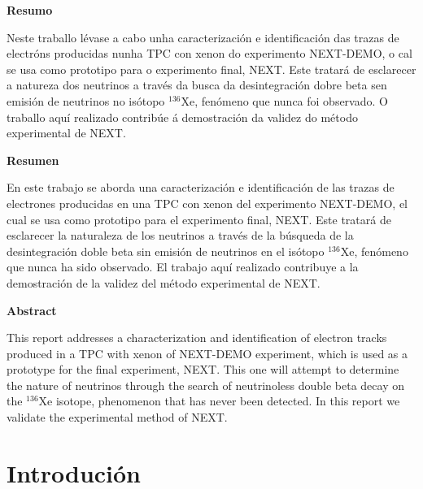 \documentclass[a4paper,12pt]{article}
\begin{document}
\thispagestyle{empty} 
\setcounter{page}{0}
\begin{center} \textbf{Resumo}\end{center}
\noindent
Neste traballo lévase a cabo unha caracterización e identificación das trazas de electróns producidas nunha TPC con xenon do experimento NEXT-DEMO, o cal se usa como prototipo para o experimento final, NEXT. Este tratará de esclarecer a natureza dos neutrinos a través da busca da desintegración dobre beta sen emisión de neutrinos no isótopo $^{136}$Xe, fenómeno que nunca foi observado. O traballo aquí realizado contribúe á demostración da validez do método experimental de NEXT.

\vspace{3cm}
\begin{center} \textbf{Resumen}\end{center}
\noindent
En este trabajo se aborda una caracterización e identificación de las trazas de electrones producidas en una TPC con xenon del experimento NEXT-DEMO, el cual se usa como prototipo para el experimento final, NEXT. Este tratará de esclarecer la naturaleza de los neutrinos a través de la búsqueda de la desintegración doble beta sin emisión de neutrinos en el isótopo $^{136}$Xe, fenómeno que nunca ha sido observado. El trabajo aquí realizado contribuye a la demostración de la validez del método experimental de NEXT.

\vspace{3cm}
\begin{center} \textbf{Abstract}\end{center}
\noindent
This report addresses a characterization and identification of electron tracks produced in a TPC with xenon of NEXT-DEMO experiment, which is used as a prototype for the final experiment, NEXT. This one will attempt to determine the nature of neutrinos through the search of neutrinoless double beta decay on the $^{136}$Xe isotope, phenomenon that has never been detected. In this report we validate the experimental method of NEXT.
\newpage

\section{Introdución}\label{intro}
\end{document}
